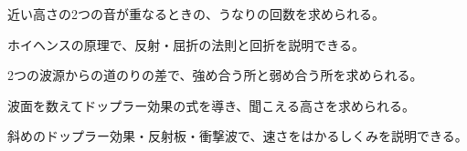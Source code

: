 \begin{furikaeri}
\begin{checklist}
\item 近い高さの2つの音が重なるときの、うなりの回数を求められる。
\item ホイヘンスの原理で、反射・屈折の法則と回折を説明できる。
\item 2つの波源からの道のりの差で、強め合う所と弱め合う所を求められる。
\item 波面を数えてドップラー効果の式を導き、聞こえる高さを求められる。
\item 斜めのドップラー効果・反射板・衝撃波で、速さをはかるしくみを説明できる。
\end{checklist}
\end{furikaeri}
